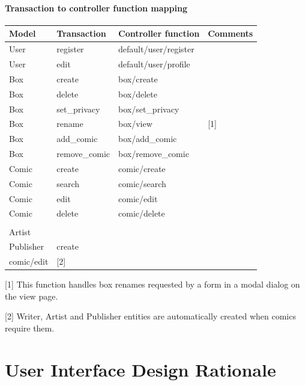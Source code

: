 \documentclass[fontsize=12pt,a4paper]{scrreprt}
\begin{document}
\subsubsection{Transaction to controller function mapping}

\begin{tabularx}{\linewidth}{lllX}\toprule
\textbf{Model} & \textbf{Transaction} & \textbf{Controller function} & \textbf{Comments} \\ \hline

User & register & default/user/register &  \\
User & edit & default/user/profile &  \\ \hline

Box & create & box/create &  \\
Box & delete & box/delete &  \\
Box & set\_privacy & box/set\_privacy &  \\
Box & rename & box/view & \textsf{[1]} \\
Box & add\_comic & box/add\_comic &  \\
Box & remove\_comic & box/remove\_comic &  \\ \hline

Comic & create & comic/create &  \\
Comic & search & comic/search &  \\
Comic & edit & comic/edit &  \\
Comic & delete & comic/delete &  \\ \hline

\begin{tabular}[c]{@{}l@{}}Writer\\ Artist\\ Publisher\end{tabular} & create & \begin{tabular}[c]{@{}l@{}}comic/create\\ comic/edit\end{tabular} & \textsf{[2]} \\

\bottomrule
\end{tabularx}

{
  \setlength{\parindent}{0}
  \setlength{\parskip}{0.4em}

  \textsf{[1]} This function handles box renames requested by a form in a modal dialog on the \textsf{view} page.

  \textsf{[2]} \textsf{Writer}, \textsf{Artist} and \textsf{Publisher} entities are automatically created when comics require them.
}

\chapter{User Interface Design Rationale}

\lipsum[3-6]
\end{document}
